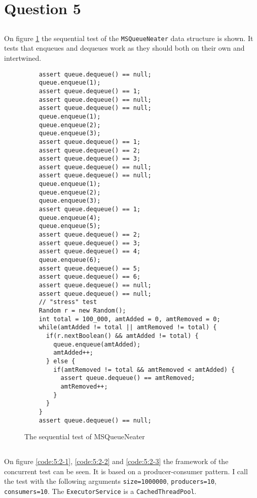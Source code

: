 \section{Question 5}
\subsection{}
On figure \ref{code:5:1} the sequential test of the \texttt{MSQueueNeater} data structure is shown. It tests that enqueues and dequeues work as they should both on their own and intertwined.

\begin{figure}
\begin{lstlisting}
    assert queue.dequeue() == null;
    queue.enqueue(1);
    assert queue.dequeue() == 1;
    assert queue.dequeue() == null;
    assert queue.dequeue() == null;
    queue.enqueue(1);
    queue.enqueue(2);
    queue.enqueue(3);
    assert queue.dequeue() == 1;
    assert queue.dequeue() == 2;
    assert queue.dequeue() == 3;
    assert queue.dequeue() == null;
    assert queue.dequeue() == null;
    queue.enqueue(1);
    queue.enqueue(2);
    queue.enqueue(3);
    assert queue.dequeue() == 1;
    queue.enqueue(4);
    queue.enqueue(5);
    assert queue.dequeue() == 2;
    assert queue.dequeue() == 3;
    assert queue.dequeue() == 4;
    queue.enqueue(6);
    assert queue.dequeue() == 5;
    assert queue.dequeue() == 6;
    assert queue.dequeue() == null;
    assert queue.dequeue() == null;
    // "stress" test
    Random r = new Random();
    int total = 100_000, amtAdded = 0, amtRemoved = 0;
    while(amtAdded != total || amtRemoved != total) {
      if(r.nextBoolean() && amtAdded != total) {
        queue.enqueue(amtAdded);
        amtAdded++;
      } else {
        if(amtRemoved != total && amtRemoved < amtAdded) {
          assert queue.dequeue() == amtRemoved;
          amtRemoved++;
        }
      }
    }
    assert queue.dequeue() == null;
\end{lstlisting}
\caption{The sequential test of MSQueueNeater}
\label{code:5:1}
\end{figure}

\subsection{}
On figure \ref{code:5:2-1}, \ref{code:5:2-2} and \ref{code:5:2-3} the framework of the concurrent test can be seen. It is based on a producer-consumer pattern. I call the test with the following arguments \texttt{size=1000000}, \texttt{producers=10}, \texttt{consumers=10}. The \texttt{ExecutorService} is a \texttt{CachedThreadPool}.

